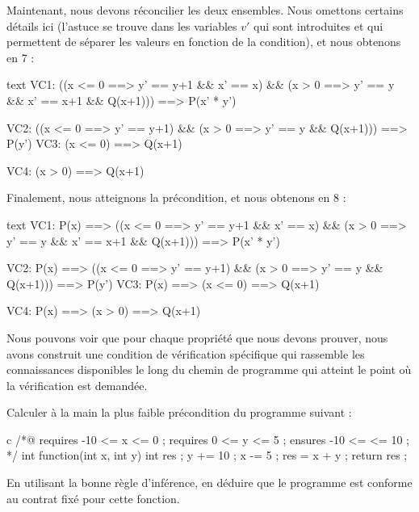 Maintenant, nous devons réconcilier les deux ensembles. Nous omettons certains
détails ici (l'astuce se trouve dans les variables $v'$ qui sont introduites et
qui permettent de séparer les valeurs en fonction de la condition), et nous
obtenons en 7 :
\begin{CodeBlock}{text}
  VC1:
    ((x <= 0 ==> y' == y+1 && x' == x) &&
     (x >  0 ==> y' == y   && x' == x+1 && Q(x+1))) ==>
       P(x' * y')

  VC2:
    ((x <= 0 ==> y' == y+1) &&
     (x >  0 ==> y' == y    && Q(x+1))) ==>
       P(y')
  VC3:
    (x <= 0) ==> Q(x+1)

  VC4:
    (x >  0) ==> Q(x+1)
\end{CodeBlock}


Finalement, nous atteignons la précondition, et nous obtenons en 8 :
\begin{CodeBlock}{text}
  VC1:
    P(x) ==>
      ((x <= 0 ==> y' == y+1 && x' == x) &&
       (x >  0 ==> y' == y   && x' == x+1 && Q(x+1))) ==>
         P(x' * y')

  VC2:
    P(x) ==>
      ((x <= 0 ==> y' == y+1) &&
       (x >  0 ==> y' == y    && Q(x+1))) ==>
         P(y')
  VC3:
    P(x) ==> (x <= 0) ==> Q(x+1)

  VC4:
    P(x) ==> (x >  0) ==> Q(x+1)
\end{CodeBlock}


Nous pouvons voir que pour chaque propriété que nous devons prouver, nous avons
construit une condition de vérification spécifique qui rassemble les connaissances
disponibles le long du chemin de programme qui atteint le point où la vérification
est demandée.






Calculer à la main la plus faible précondition du programme suivant :


\begin{CodeBlock}{c}
/*@
  requires -10 <= x <= 0 ;
  requires 0 <= y <= 5 ;
  ensures -10 <= \result <= 10 ;
*/
int function(int x, int y){
  int res ;
  y += 10 ;
  x -= 5 ;
  res = x + y ;
  return res ;
}
\end{CodeBlock}


En utilisant la bonne règle d'inférence, en déduire que le programme est
conforme au contrat fixé pour cette fonction.






